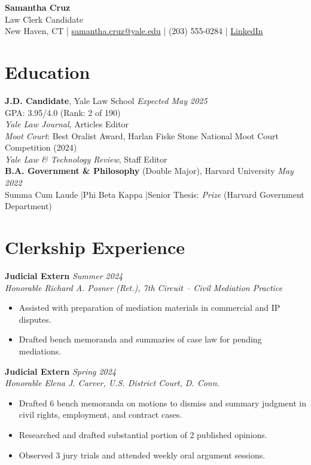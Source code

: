 \documentclass[11pt,a4paper]{article}
\begin{document}
\begin{center}
  {\LARGE \textbf{Samantha Cruz}}\\[3pt]
  Law Clerk Candidate\\[4pt]
  New Haven, CT \quad|\quad
  \href{mailto:samantha.cruz@yale.edu}{samantha.cruz@yale.edu} \quad|\quad
  (203) 555-0284 \quad|\quad
  \href{https://linkedin.com/in/samanthacruz-law}{LinkedIn}
\end{center}

\section{Education}
\noindent\textbf{J.D. Candidate}, Yale Law School \hfill \textit{Expected May 2025}\\
GPA: 3.95/4.0 (Rank: 2 of 190)\\
\textit{Yale Law Journal}, Articles Editor\\
\textit{Moot Court}: Best Oralist Award, Harlan Fiske Stone National Moot Court Competition (2024)\\
\textit{Yale Law \& Technology Review}, Staff Editor\\[4pt]
\noindent\textbf{B.A. Government \& Philosophy} (Double Major), Harvard University \hfill \textit{May 2022}\\
Summa Cum Laude \quad|\quad Phi Beta Kappa \quad|\quad Senior Thesis: \textit{Prize} (Harvard Government Department)

\section{Clerkship Experience}

\noindent\textbf{Judicial Extern} \hfill \textit{Summer 2024}\\
\textit{Honorable Richard A. Posner (Ret.), 7th Circuit -- Civil Mediation Practice}
\begin{itemize}
  \item Assisted with preparation of mediation materials in commercial and IP disputes.
  \item Drafted bench memoranda and summaries of case law for pending mediations.
\end{itemize}

\vspace{4pt}
\noindent\textbf{Judicial Extern} \hfill \textit{Spring 2024}\\
\textit{Honorable Elena J. Carver, U.S. District Court, D. Conn.}
\begin{itemize}
  \item Drafted 6 bench memoranda on motions to dismiss and summary judgment in civil rights, employment, and contract cases.
  \item Researched and drafted substantial portion of 2 published opinions.
  \item Observed 3 jury trials and attended weekly oral argument sessions.
\end{itemize}
\end{document}
